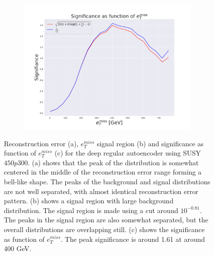 \begin{figure}[H]
    \hfill 
    \begin{subfigure}{.49\textwidth}
        \includegraphics[width=\textwidth]{Figures/VAE_testing/big/2lep/significance_etmiss_450p0p0300_-0.8121874101107931.pdf}
        \caption{}
        \label{fig:VAE_2lep_big_signi_450}
    \end{subfigure}
    \hfill      
    \caption[2lep deep network | $450p300$ | VAE]{Reconstruction error (a), $e_T^{miss}$ signal region (b) and significance as function of 
    $e_T^{miss}$ (c) for the deep regular autoencoder using SUSY $450p300$. 
    (a) shows that the peak of the distribution is somewhat centered in the middle 
    of the reconstruction error range forming a bell-like shape. The peaks of the background and signal 
    distributions are not well separated, with almost identical reconstruction error pattern. (b) 
    shows a signal region with large background distribution. The signal region is made using a cut around
    $10^{-0.81}$. The peaks in the signal region are also somewhat 
    separated, but the overall distributions are overlapping still. 
    (c) shows the significance as function of $e_T^{miss}$. 
    The peak significance is around 1.61 at around 400 GeV.}
    \label{fig:VAE_2lep_big_rec_sig_signi_450}
\end{figure}


